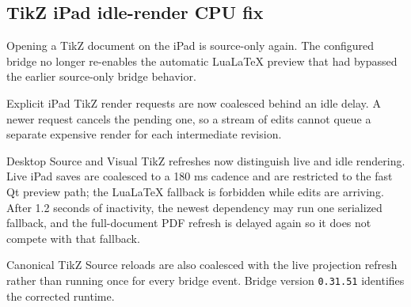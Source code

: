 \documentclass[a4paper]{article}
\title{}
\date{}
\author{Mohammad Rahmani}
\begin{document}
   \maketitle

   \begin{preview}
      \section*{TikZ iPad idle-render CPU fix}

      Opening a TikZ document on the iPad is source-only again. The configured bridge no longer re-enables the automatic LuaLaTeX preview that had bypassed the earlier source-only bridge behavior.

      Explicit iPad TikZ render requests are now coalesced behind an idle delay. A newer request cancels the pending one, so a stream of edits cannot queue a separate expensive render for each intermediate revision.

      Desktop Source and Visual TikZ refreshes now distinguish live and idle rendering. Live iPad saves are coalesced to a 180 ms cadence and are restricted to the fast Qt preview path; the LuaLaTeX fallback is forbidden while edits are arriving. After 1.2 seconds of inactivity, the newest dependency may run one serialized fallback, and the full-document PDF refresh is delayed again so it does not compete with that fallback.

      Canonical TikZ Source reloads are also coalesced with the live projection refresh rather than running once for every bridge event. Bridge version \texttt{0.31.51} identifies the corrected runtime.
   \end{preview}

   
   
\end{document}
